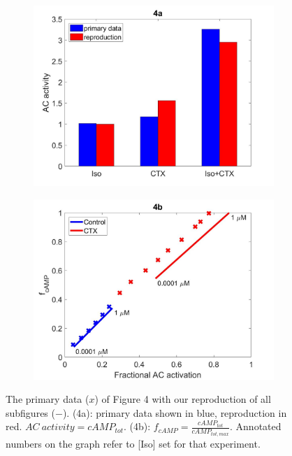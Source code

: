 \documentclass[fleqn,10pt]{physiome}
\begin{document}
\begin{figure}
    \centering
    \begin{subfigure}[b]{0.49\textwidth}
        \centering
        \includegraphics[width=\textwidth]{figures/F4a.jpg}
    \end{subfigure}
    \begin{subfigure}[b]{0.49\textwidth}
        \centering
        \includegraphics[width=\textwidth]{figures/F4b.jpg}
    \end{subfigure}
    \caption{The primary data ($x$) of Figure 4 with our reproduction of all subfigures ($-$). (4a): primary data shown in blue, reproduction in red. $AC\ activity=cAMP_{tot}$. (4b):  $f_{cAMP}=\frac{cAMP_{tot}}{cAMP_{tot,max}}$. Annotated numbers on the graph refer to [Iso] set for that experiment.}
    \label{fig:4}
\end{figure}
\end{document}
